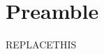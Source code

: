 \documentclass[oneside]{book}%
\date{}
\author{Mattia Mascarello}
\begin{document}
	\maketitle
	
	\tableofcontents
\chapter{Preamble}
\blindtext
\newpage
REPLACETHIS
\end{document}
